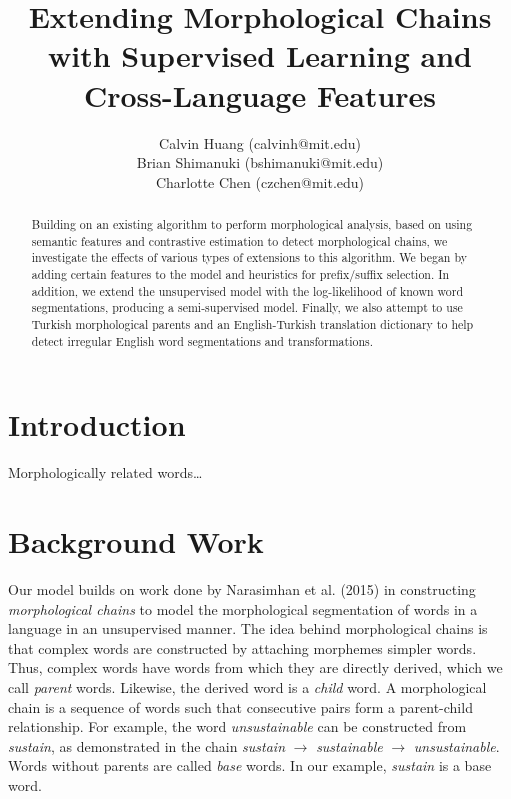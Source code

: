 \documentclass[11pt,twocolumn]{article}
\begin{document}
\title{Extending Morphological Chains with Supervised Learning and Cross-Language Features}

\author{Calvin Huang (calvinh@mit.edu)\\
    Brian Shimanuki (bshimanuki@mit.edu)\\
    Charlotte Chen (czchen@mit.edu)
\\
}

\maketitle
\thispagestyle{empty}

\begin{abstract}
    Building on an existing algorithm to perform morphological analysis,
    based on using semantic features and contrastive estimation to detect morphological chains,
    we investigate the effects of various types of extensions to this algorithm.
    We began by adding certain features to the model and heuristics for prefix/suffix selection.
    In addition, we extend the unsupervised model with the log-likelihood of known word segmentations,
    producing a semi-supervised model.
    Finally, we also attempt to use Turkish morphological parents and an English-Turkish translation
    dictionary to help detect irregular English word segmentations and transformations.
\end{abstract}

\section{Introduction}
Morphologically related words\dots %

\section{Background Work}
Our model builds on work done by Narasimhan et al. (2015) in constructing \emph{morphological chains} to model the morphological segmentation of words in a language in an unsupervised manner. The idea behind morphological chains is that complex words are constructed by attaching morphemes simpler words. Thus, complex words have words from which they are directly derived, which we call \emph{parent} words. Likewise, the derived word is a \emph{child} word. A morphological chain is a sequence of words such that consecutive pairs form a parent-child relationship. For example, the word \emph{unsustainable} can be constructed from \emph{sustain}, as demonstrated in the chain \emph{sustain} $\rightarrow$ \emph{sustainable} $\rightarrow$ \emph{unsustainable}. Words without parents are called \emph{base} words. In our example, \emph{sustain} is a base word.
\end{document}
